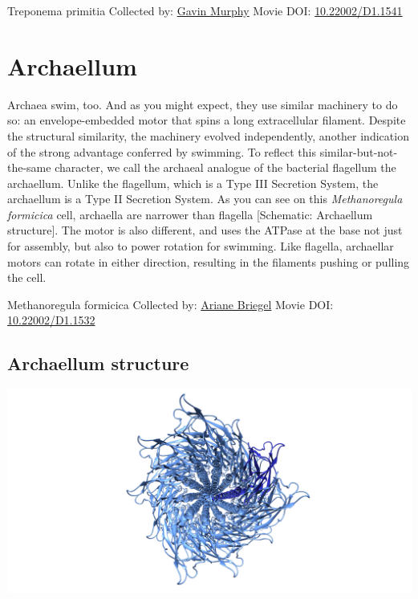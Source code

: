 \documentclass[]{tufte-book}
\begin{document}
\hypertarget{htmlwidget-6d720ca49aaaf75cc3f0}{}

\label{fig:6-7a}Treponema primitia Collected by: \protect\hyperlink{gavin_murphy}{Gavin Murphy} Movie DOI: \href{https://doi.org/10.22002/D1.1541}{10.22002/D1.1541}

\hypertarget{archaellum}{%
\section{Archaellum}\label{archaellum}}

Archaea swim, too. And as you might expect, they use similar machinery to do so: an envelope-embedded motor that spins a long extracellular filament. Despite the structural similarity, the machinery evolved independently, another indication of the strong advantage conferred by swimming. To reflect this similar-but-not-the-same character, we call the archaeal analogue of the bacterial flagellum the archaellum. Unlike the flagellum, which is a Type III Secretion System, the archaellum is a Type II Secretion System. As you can see on this \emph{Methanoregula formicica} cell, archaella are narrower than flagella {[}Schematic: Archaellum structure{]}. The motor is also different, and uses the ATPase at the base not just for assembly, but also to power rotation for swimming. Like flagella, archaellar motors can rotate in either direction, resulting in the filaments pushing or pulling the cell.



\hypertarget{htmlwidget-f81d13ae0ffe82743553}{}

\label{fig:6-8}Methanoregula formicica Collected by: \protect\hyperlink{ariane_briegel}{Ariane Briegel} Movie DOI: \href{https://doi.org/10.22002/D1.1532}{10.22002/D1.1532}

\hypertarget{Archaellum_structure}{%
\subsection{Archaellum structure}\label{Archaellum_structure}}

\includegraphics{img/schematics/6_8_1}
\end{document}
